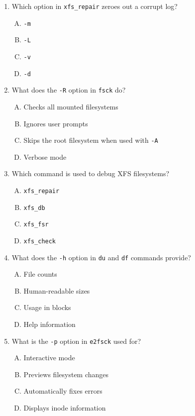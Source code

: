 \documentclass[a4paper]{report}
\begin{document}
\begin{enumerate}[1.]
    \item Which option in \texttt{xfs\_repair} zeroes out a corrupt log?  
    \begin{enumerate}[A)]
        \item \texttt{-m}  
        \item \texttt{-L}  
        \item \texttt{-v}  
        \item \texttt{-d}  
    \end{enumerate}

    \item What does the \texttt{-R} option in \texttt{fsck} do?  
    \begin{enumerate}[A)]
        \item Checks all mounted filesystems  
        \item Ignores user prompts  
        \item Skips the root filesystem when used with \texttt{-A}  
        \item Verbose mode  
    \end{enumerate}

    \item Which command is used to debug XFS filesystems?  
    \begin{enumerate}[A)]
        \item \texttt{xfs\_repair}  
        \item \texttt{xfs\_db}  
        \item \texttt{xfs\_fsr}  
        \item \texttt{xfs\_check}  
    \end{enumerate}

    \item What does the \texttt{-h} option in \texttt{du} and \texttt{df} commands provide?  
    \begin{enumerate}[A)]
        \item File counts  
        \item Human-readable sizes  
        \item Usage in blocks  
        \item Help information  
    \end{enumerate}

    \item What is the \texttt{-p} option in \texttt{e2fsck} used for?  
    \begin{enumerate}[A)]
        \item Interactive mode  
        \item Previews filesystem changes  
        \item Automatically fixes errors  
        \item Displays inode information  
    \end{enumerate}


\end{enumerate}
\end{document}
